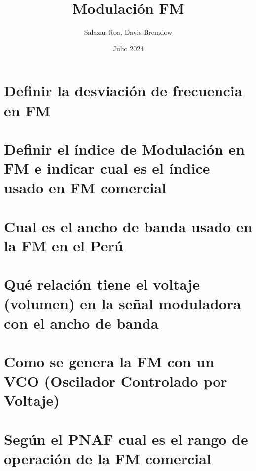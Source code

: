 \documentclass[]{article}
\title{Modulación FM}
\author{Salazar Roa, Davis Bremdow}
\date{ Julio 2024}
\begin{document}
	\maketitle
	\section{Definir la desviación de frecuencia en FM}
	
	\section{Definir el índice de Modulación en FM e indicar cual es el índice usado en FM comercial}
	
	\section{Cual es el ancho de banda usado en la FM en el Perú}
	
	\section{Qué relación tiene el voltaje (volumen) en la señal moduladora con el ancho de banda}
	
	\section{Como se genera la FM con un VCO (Oscilador Controlado por Voltaje)}
	
	
	\section{Según el PNAF cual es el rango de operación de la FM comercial}
	
\end{document}
